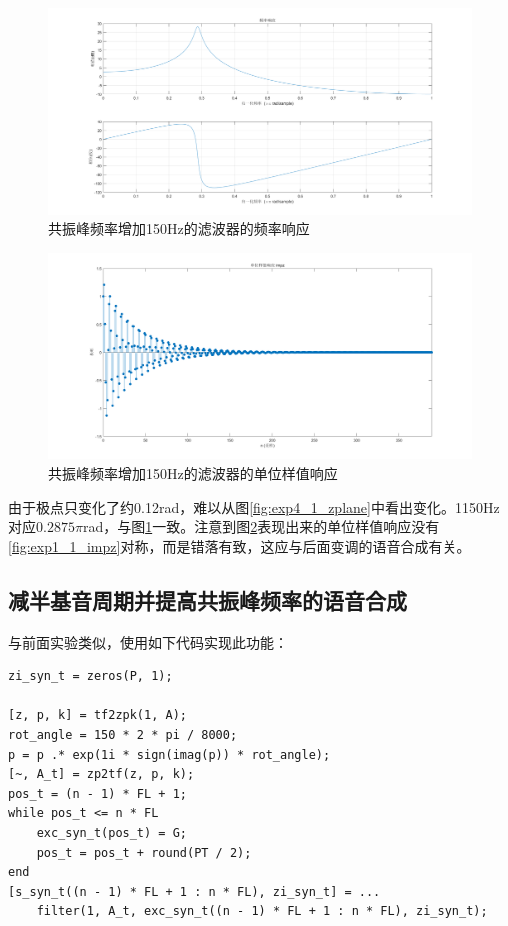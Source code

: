\documentclass[10pt, a4paper]{article}
\begin{document}
\begin{figure}[h]
    \centering
    \includegraphics[width=.8\textwidth]{../assets/4_1_freqz.png}
    \caption{共振峰频率增加150Hz的滤波器的频率响应}
    \label{fig:exp4_1_freqz}
\end{figure}

\begin{figure}[!ht]
    \centering
    \includegraphics[width=.8\textwidth]{../assets/4_1_impz.png}
    \caption{共振峰频率增加150Hz的滤波器的单位样值响应}
    \label{fig:exp4_1_impz}
\end{figure}

由于极点只变化了约0.12rad，难以从图\ref{fig:exp4_1_zplane}中看出变化。1150Hz对应0.$2875\pi$rad，与图\ref{fig:exp4_1_freqz}一致。注意到图\ref{fig:exp4_1_impz}表现出来的单位样值响应没有\ref{fig:exp1_1_impz}对称，而是错落有致，这应与后面变调的语音合成有关。

\subsection{减半基音周期并提高共振峰频率的语音合成}

与前面实验类似，使用如下代码实现此功能：

\begin{verbatim}
zi_syn_t = zeros(P, 1);

[z, p, k] = tf2zpk(1, A);
rot_angle = 150 * 2 * pi / 8000;
p = p .* exp(1i * sign(imag(p)) * rot_angle);
[~, A_t] = zp2tf(z, p, k);
pos_t = (n - 1) * FL + 1;
while pos_t <= n * FL
    exc_syn_t(pos_t) = G;
    pos_t = pos_t + round(PT / 2);
end
[s_syn_t((n - 1) * FL + 1 : n * FL), zi_syn_t] = ...
    filter(1, A_t, exc_syn_t((n - 1) * FL + 1 : n * FL), zi_syn_t);
\end{verbatim}
\end{document}
